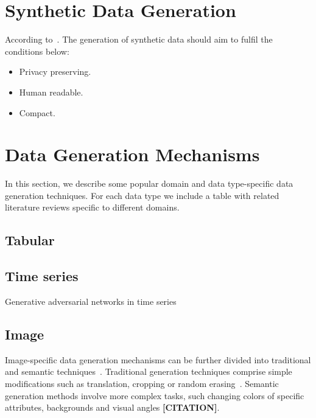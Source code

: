 \documentclass[parskip=full]{scrartcl}
\begin{document}
\section{Synthetic Data Generation}

According to~\cite{assefa2020generating}. The generation of synthetic data
should aim to fulfil the conditions below:

\begin{itemize}
    \item Privacy preserving.
    \item Human readable.
    \item Compact.
\end{itemize}

\section{Data Generation Mechanisms}

In this section, we describe some popular domain and data type-specific data
generation techniques. For each data type we include a table with related
literature reviews specific to different domains.

\subsection{Tabular}

\subsection{Time series}

Generative adversarial networks in time series 

\subsection{Image}

Image-specific data generation mechanisms can be further divided into
traditional and semantic techniques~\cite{wang2021regularizing}. Traditional
generation techniques comprise simple modifications such as translation,
cropping or random erasing~\cite{zhong2017random}. Semantic generation methods
involve more complex tasks, such changing colors of specific attributes,
backgrounds and visual angles \textbf{[CITATION]}. 
\end{document}
